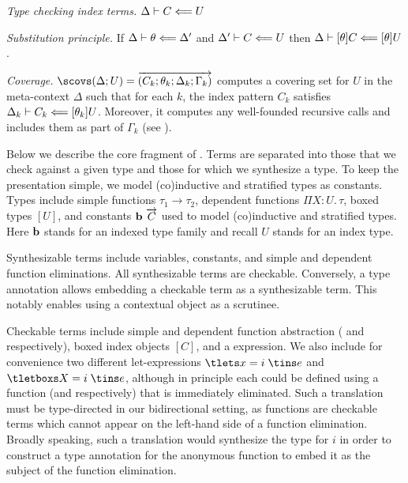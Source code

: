 \begin{description}
\item \emph{Type checking index terms.} $\Delta \vdash C \Longleftarrow U$
\item \emph{Substitution principle.} If $\Delta \vdash \theta \Longleftarrow \Delta'$ and $\Delta' \vdash C \Longleftarrow U$ then
  $\Delta \vdash [\theta]C \Longleftarrow [\theta]U$.
\item \emph{Coverage.}
  $\scovs (\Delta; U) = \vec{(C_k; \theta_k; \Delta_k; \Gamma_k)}$
  computes a covering set for $U$ in the meta-context $\Delta$
  such that for each $k$, the index pattern $C_k$ satisfies
  $\Delta_k \vdash C_k \Longleftarrow [\theta_k]U$.
  Moreover, it computes any well-founded recursive calls and includes them as
  part of $\Gamma_k$ (see \cite{Pientka:TLCA15}).
\end{description}


Below we describe the core fragment of \Beluga{}.
Terms are separated into those that we check against a given type and those for
which we synthesize a type.
To keep the presentation simple, we model (co)inductive and stratified types as
constants.
Types include simple functions $\tau_1 \to \tau_2$,
dependent functions $\Pi X{:}U.\,\tau$,
boxed types $[U]$, and constants $\textbf{b}~\overrightarrow{C}$ used to model (co)inductive
and stratified types.
Here $\textbf{b}$ stands for an indexed type family and recall $U$ stands for an
index type.
%

%
Synthesizable terms include variables, constants, and simple and dependent
function eliminations.
All synthesizable terms are checkable.
Conversely, a type annotation allows embedding a checkable term as a
synthesizable term.
This notably enables using a contextual object as a \tcases scrutinee.

Checkable terms include simple and dependent function abstraction (\tfn{} and
\tmlam{} respectively), boxed index objects $[C]$, and a \tcases expression.
We also include for convenience two different let-expressions
$\tlets x = i\;\tins e$ and $\tletboxs X = i\;\tins e$,
although in principle each could be defined using a function (\tfns and \tmlams
respectively) that is immediately eliminated.
Such a translation must be type-directed in our bidirectional setting, as
functions are checkable terms which cannot appear on the left-hand side of a
function elimination.
Broadly speaking, such a translation would synthesize the type for $i$ in order
to construct a type annotation for the anonymous function to embed it as the
subject of the function elimination.

